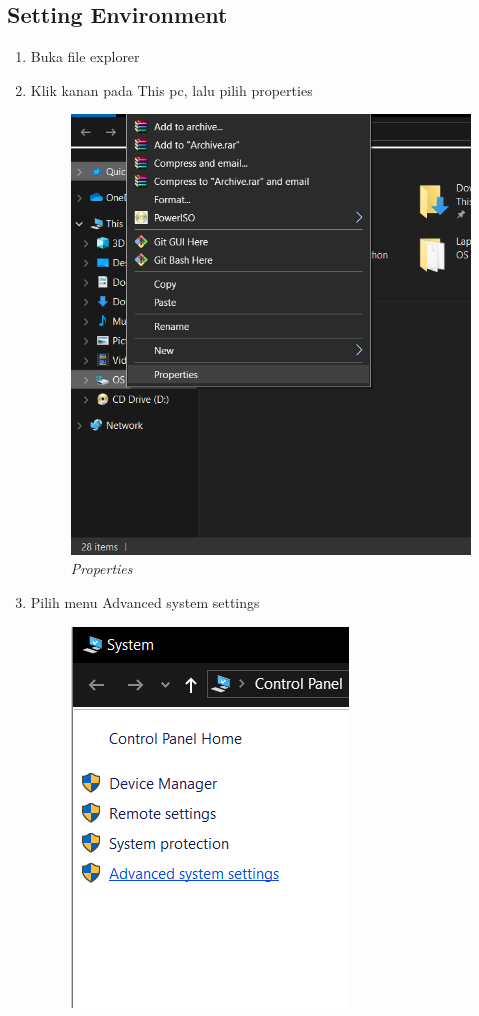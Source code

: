 \subsection{Setting Environment}
\begin{enumerate}
\item Buka file explorer
\item Klik kanan pada This pc, lalu pilih properties
\begin{figure}[H]
    \centering
    \includegraphics[scale=0.7]{figures/properties}
    \caption{\textit{Properties}}
    \label{Environment1}
\end{figure}
\item Pilih menu Advanced system settings
\begin{figure}[H]
    \centering
    \includegraphics[scale=0.7]{figures/advanced}

\end{figure}
\end{enumerate}
